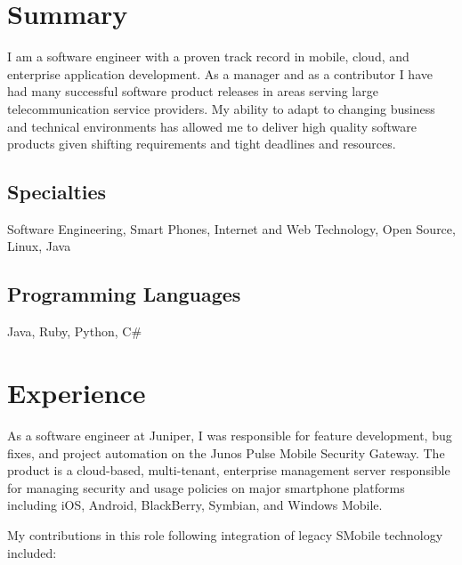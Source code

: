 \documentclass[12pt,letter,sans]{moderncv}
\begin{document}
\makecvtitle

\section{Summary}

I am a software engineer with a proven track record in mobile, cloud, and
enterprise application development. As a manager and as a contributor I have
had many successful software product releases in areas serving large
telecommunication service providers. My ability to adapt to changing business
and technical environments has allowed me to deliver high quality software
products given shifting requirements and tight deadlines and resources.

\subsection{Specialties}

Software Engineering, Smart Phones, Internet and Web Technology, Open Source, Linux, Java

\subsection{Programming Languages}

Java, Ruby, Python, C\#

\section{Experience}


As a software engineer at Juniper, I was responsible for feature development,
bug fixes, and project automation on the Junos Pulse Mobile Security Gateway.
The product is a cloud-based, multi-tenant, enterprise management server
responsible for managing security and usage policies on major smartphone
platforms including iOS, Android, BlackBerry, Symbian, and Windows Mobile.

My contributions in this role following integration of legacy SMobile technology
included:
\end{document}
